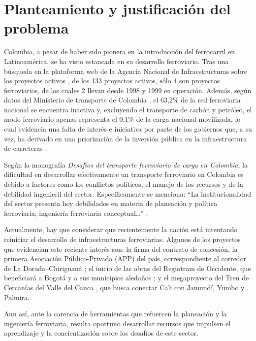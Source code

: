 \section{Planteamiento y justificación del problema}
Colombia, a pesar de haber sido pionera en la introducción del ferrocarril en Latinoamérica, se ha visto estancada en su desarrollo ferroviario. Tras una búsqueda en la plataforma web de la Agencia Nacional de Infraestructuras sobre los proyectos activos \autocite{aniProyectos}, de los 133 proyectos activos, sólo 4 son proyectos ferroviarios, de los cuales 2 llevan desde 1998 y 1999 en operación. Además, según datos del Ministerio de transporte de Colombia \autocite{mintransporteSurcos2024}, el 63,2\% de la red ferroviaria nacional se encuentra inactiva y, excluyendo el transporte de carbón y petróleo, el modo ferroviario apenas representa el 0,1\% de la carga nacional movilizada, lo cual evidencia una falta de interés e iniciativa por parte de los gobiernos que, a su vez, ha derivado en una priorización de la inversión pública en la infraestructura de carreteras \autocite{mintransporteDatosCarga}.

Según la monografía \textit{Desafíos del transporte ferroviario de carga en Colombia}, la dificultad en desarrollar efectivamente un transporte ferroviario en Colombia es debido a factores como los conflictos políticos, el manejo de los recursos y de la debilidad ingenieril del sector. Específicamente se menciona: “La institucionalidad del sector presenta hoy debilidades en materia de planeación y política ferroviaria; ingeniería ferroviaria conceptual…” \autocite[p.~17]{iabdDesafios}.

Actualmente, hay que considerar que recientemente la nación está intentando reiniciar el desarrollo de infraestructuras ferroviarias. Algunos de los proyectos que evidencian este reciente interés son: la firma del contrato de concesión, la primera Asociación Público-Privada (APP) del país, correspondiente al corredor de La Dorada–Chiriguaná \autocite{mintransporteAPP2025}; el inicio de las obras del Regiotram de Occidente, que beneficiará a Bogotá y a sus municipios aledaños \autocite{bogotaRegiotram2025}; y el megaproyecto del Tren de Cercanías del Valle del Cauca \autocite{valoraTrenValle2024}, que busca conectar Cali con Jamundí, Yumbo y Palmira.

Aun así, ante la carencia de herramientas que refuercen la planeación y la ingeniería ferroviaria, resulta oportuno desarrollar recursos que impulsen el aprendizaje y la concientización sobre los desafíos de este sector.

